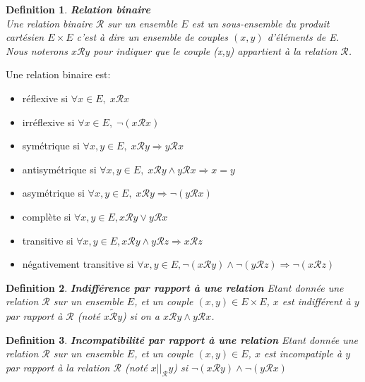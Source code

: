 \documentclass[a4paper,12pt,openany,oneside]{article}
\newtheorem{defn}{Definition} %
\begin{document}
\begin{defn}\textbf{Relation binaire}\\

Une relation binaire $\mathcal{R}$ sur un ensemble $E$ est un sous-ensemble du produit cartésien $E \times E$ c'est à dire un ensemble de couples $(x,y)$ d'éléments de E.
Nous noterons $x\mathcal{R}y$ pour indiquer que le couple (x,y) appartient à la relation $\mathcal{R}$.

\end{defn}

Une relation binaire est:

\begin{itemize}
        \item réflexive si $\forall x\in E,\; x\mathcal{R}x$
        \item irréflexive si $\forall x\in E,\; \neg(x\mathcal{R}x)$
        \item symétrique si $\forall x,y\in E,\; x\mathcal{R}y\Rightarrow y\mathcal{R}x$
        \item antisymétrique si $\forall x,y\in E,\; x\mathcal{R}y\wedge y\mathcal{R}x\Rightarrow x=y$
        \item asymétrique si $\forall x,y\in E,\; x\mathcal{R}y\Rightarrow \neg(y\mathcal{R}x)$
        \item complète si $\forall x,y\in E, x\mathcal{R} y\vee y\mathcal{R}x$
        \item transitive si $\forall x,y\in E, x\mathcal{R} y\wedge y\mathcal{R}z\Rightarrow x\mathcal{R}z$
        \item négativement transitive si $\forall x,y\in E, \neg (x\mathcal{R} y)\wedge \neg (y\mathcal{R}z)\Rightarrow \neg(x\mathcal{R}z)$

\end{itemize}


\begin{defn}\textbf{Indifférence par rapport à une relation}
        Etant donnée une relation $\mathcal{R}$  sur un ensemble $E$, et un couple $(x,y)\in E\times E$, $x$  est indifférent à $y$ par rapport à $\mathcal{R}$ (noté $x\tilde{\mathcal{R}}y$) si on a $x\mathcal{R}y\wedge y\mathcal{R}x$.
\end{defn}

\begin{defn}\textbf{Incompatibilité par rapport à une relation}
        Etant donnée une relation $\mathcal{R}$ sur un ensemble $E$, et un couple $(x,y)\in E$, $x$ est incompatiple à $y$ par rapport à la relation $\mathcal{R}$ (noté $x||_\mathcal{R}y$) si $\neg(x\mathcal{R}y)\wedge\neg (y\mathcal{R}x)$
\end{defn}
\end{document}
